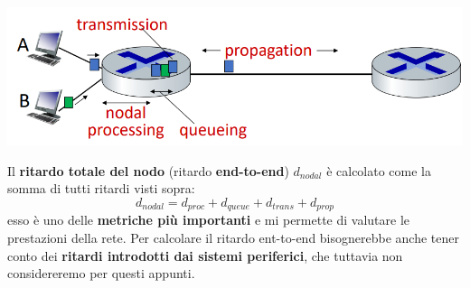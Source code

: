 \documentclass[12pt]{article}
\begin{document}
\begin{center}
    \includegraphics[width =0.70\linewidth]{Images/19.PNG}
\end{center}
Il \textbf{ritardo totale del nodo} (ritardo \textbf{end-to-end}) $d_{nodal}$ è calcolato come la somma di tutti ritardi visti sopra:
$$d_{nodal} = d_{proc} + d_{queue} + d_{trans} + d_{prop}$$
esso è uno delle \textbf{metriche più importanti} e mi permette di valutare le prestazioni della rete. Per calcolare il ritardo ent-to-end bisognerebbe anche tener conto dei \textbf{ritardi introdotti dai sistemi periferici},
che tuttavia non considereremo per questi appunti.
\end{document}
